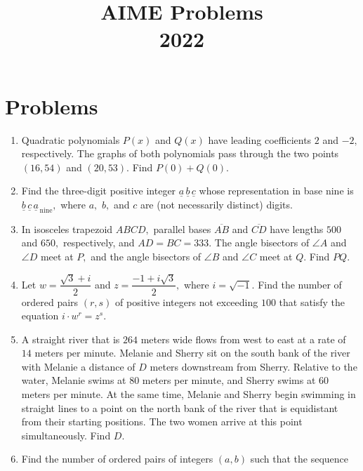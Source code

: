 \documentclass{article}
\title{AIME Problems \\ 2022}
\date{}
\begin{document}
\maketitle\thispagestyle{fancy}\newpage\section*{Problems}\begin{enumerate}[label=\arabic*., itemsep=0.5em]\item Quadratic polynomials $P(x)$ and $Q(x)$ have leading coefficients $2$ and $-2,$ respectively. The graphs of both polynomials pass through the two points $(16,54)$ and $(20,53).$ Find $P(0) + Q(0).$\par \vspace{0.5em}\item Find the three-digit positive integer $\underline{a}\,\underline{b}\,\underline{c}$ whose representation in base nine is $\underline{b}\,\underline{c}\,\underline{a}_{\,\text{nine}},$ where $a,$ $b,$ and $c$ are (not necessarily distinct) digits.\par \vspace{0.5em}\item In isosceles trapezoid $ABCD,$ parallel bases $\overline{AB}$ and $\overline{CD}$ have lengths $500$ and $650,$ respectively, and $AD=BC=333.$ The angle bisectors of $\angle A$ and $\angle D$ meet at $P,$ and the angle bisectors of $\angle B$ and $\angle C$ meet at $Q.$ Find $PQ.$\par \vspace{0.5em}\item Let $w = \dfrac{\sqrt{3} + i}{2}$ and $z = \dfrac{-1 + i\sqrt{3}}{2},$ where $i = \sqrt{-1}.$ Find the number of ordered pairs $(r,s)$ of positive integers not exceeding $100$ that satisfy the equation $i \cdot w^r = z^s.$\par \vspace{0.5em}\item A straight river that is $264$ meters wide flows from west to east at a rate of $14$ meters per minute. Melanie and Sherry sit on the south bank of the river with Melanie a distance of $D$ meters downstream from Sherry. Relative to the water, Melanie swims at $80$ meters per minute, and Sherry swims at $60$ meters per minute. At the same time, Melanie and Sherry begin swimming in straight lines to a point on the north bank of the river that is equidistant from their starting positions. The two women arrive at this point simultaneously. Find $D.$\par \vspace{0.5em}\item Find the number of ordered pairs of integers $(a,b)$ such that the sequence 

\end{enumerate}
\end{document}
